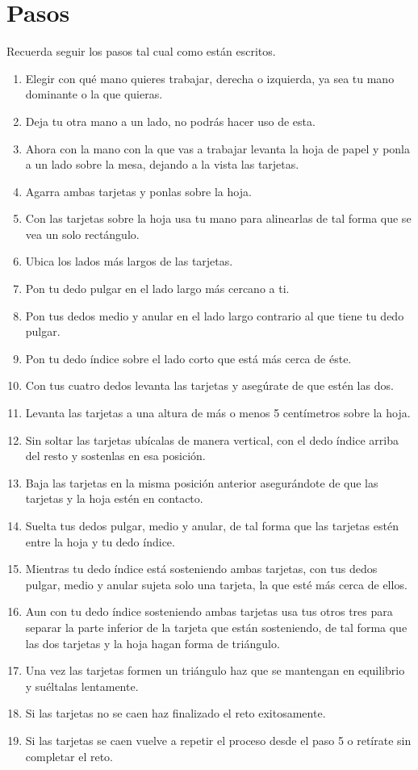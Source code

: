 \documentclass{article}
\begin{document}
\section{Pasos} \label{contenido}
Recuerda seguir los pasos tal cual como están escritos.
\begin{enumerate}
    \item Elegir con qué mano quieres trabajar, derecha o izquierda, ya sea tu mano dominante o la que quieras.
    \item Deja tu otra mano a un lado, no podrás hacer uso de esta.
    \item Ahora con la mano con la que vas a trabajar levanta la hoja de papel y ponla a un lado sobre la mesa, dejando a la vista las tarjetas.
    \item Agarra ambas tarjetas y ponlas sobre la hoja.
    \item Con las tarjetas sobre la hoja usa tu mano para alinearlas de tal forma que se vea un solo rectángulo.
    \item Ubica los lados más largos de las tarjetas.
    \item Pon tu dedo pulgar en el lado largo más cercano a ti.
    \item Pon tus dedos medio y anular en el lado largo contrario al que tiene tu dedo pulgar.
    \item Pon tu dedo índice sobre el lado corto que está más cerca de éste.
    \item Con tus cuatro dedos levanta las tarjetas y asegúrate de que estén las dos.
    \item Levanta las tarjetas a una altura de más o menos 5 centímetros sobre la hoja.
    \item Sin soltar las tarjetas ubícalas de manera vertical, con el dedo índice arriba del resto y sostenlas en esa posición.
    \item Baja las tarjetas en la misma posición anterior asegurándote de que las tarjetas y la hoja estén en contacto.
    \item Suelta tus dedos pulgar, medio y anular, de tal forma que las tarjetas estén entre la hoja y tu dedo índice.
    \item Mientras tu dedo índice está sosteniendo ambas tarjetas, con tus dedos pulgar, medio y anular sujeta solo una tarjeta, la que esté más cerca de ellos.
    \item Aun con tu dedo índice sosteniendo ambas tarjetas usa tus otros tres para separar la parte inferior de la tarjeta que están sosteniendo, de tal forma que las dos tarjetas y la hoja hagan forma de triángulo.
    \item Una vez las tarjetas formen un triángulo haz que se mantengan en equilibrio y suéltalas lentamente.
    \item Si las tarjetas no se caen haz finalizado el reto exitosamente.
    \item Si las tarjetas se caen vuelve a repetir el proceso desde el paso 5 o retírate sin completar el reto.

\end{enumerate}
\end{document}
